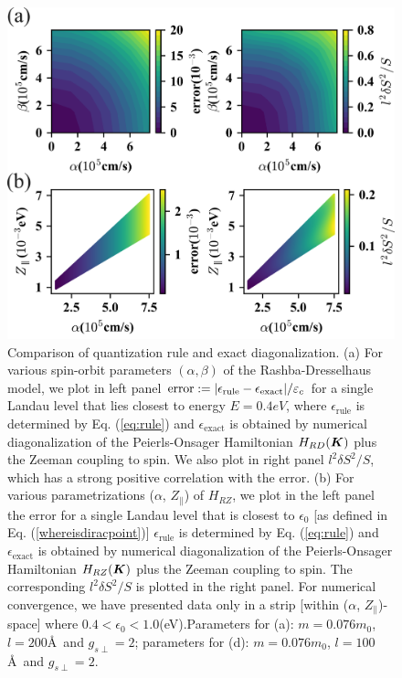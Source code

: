 \documentclass[aps, showpacs, twocolumn, notitlepage, superscriptaddress]{revtex4-1}
\begin{document}
\begin{figure}
\includegraphics[width=1.0\columnwidth]{error.png}
\caption{{Comparison of quantization rule and exact diagonalization. (a) For various spin-orbit parameters $(\alpha,\beta)$ of the Rashba-Dresselhaus model, we plot in left panel $\text{error}:=|\epsilon_\text{rule}-\epsilon_\text{exact}|/\varepsilon_c$ for a single Landau level that lies closest to energy $E=0.4eV$, where $\epsilon_\text{rule}$ is determined by Eq. (\ref{eq:rule}) and $\epsilon_{\text{exact}}$ is obtained by numerical diagonalization of the Peierls-Onsager Hamiltonian $H_{RD}(\boldsymbol{K})$ plus the Zeeman coupling to spin. We also plot in right panel $l^2\delta S^2/S$, which has a strong positive correlation with the error. (b) For various parametrizations ($\alpha$, $Z_\parallel$) of $H_{RZ}$, we plot in the left panel the error for a single Landau level that is closest to $\epsilon_0$ [as defined in Eq. (\ref{whereisdiracpoint})] $\epsilon_\text{rule}$ is determined by Eq. (\ref{eq:rule}) and $\epsilon_{\text{exact}}$ is obtained by numerical diagonalization of the Peierls-Onsager Hamiltonian $H_{RZ}(\boldsymbol{K})$ plus the Zeeman coupling to spin. The corresponding $l^2 \delta S^2/S$ is plotted in the right panel. For numerical convergence\cite{RZfignote}, we have presented data only in a strip [within ($\alpha$, $Z_\parallel$)-space] where $0.4{<}\epsilon_0{<}1.0$(eV).Parameters for (a): $m=0.076m_0$, $l=200$\AA~and $g_{s\perp}=2$; parameters for (d): $m=0.076m_0$, $l=100$\AA~and $g_{s\perp}=2$.}\label{fig:error}}
\end{figure}
\end{document}
